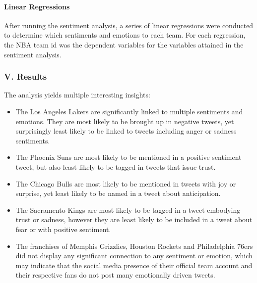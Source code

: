 \documentclass[
]{article}
\begin{document}
\hfill\break

\hypertarget{linear-regressions}{%
\paragraph{Linear Regressions}\label{linear-regressions}}

After running the sentiment analysis, a series of linear regressions
were conducted to determine which sentiments and emotions to each team.
For each regression, the NBA team id was the dependent variables for the
variables attained in the sentiment analysis.

\hfill\break

\hypertarget{v.-results}{%
\subsubsection{V. Results}\label{v.-results}}

The analysis yields multiple interesting insights:

\begin{itemize}
\item
  The Los Angeles Lakers are significantly linked to multiple sentiments
  and emotions. They are most likely to be brought up in negative
  tweets, yet surprisingly least likely to be linked to tweets including
  anger or sadness sentiments.
\item
  The Phoenix Suns are most likely to be mentioned in a positive
  sentiment tweet, but also least likely to be tagged in tweets that
  issue trust.
\item
  The Chicago Bulls are most likely to be mentioned in tweets with joy
  or surprise, yet least likely to be named in a tweet about
  anticipation.
\item
  The Sacramento Kings are most likely to be tagged in a tweet embodying
  trust or sadness, however they are least likely to be included in a
  tweet about fear or with positive sentiment.
\item
  The franchises of Memphis Grizzlies, Houston Rockets and Philadelphia
  76ers did not display any significant connection to any sentiment or
  emotion, which may indicate that the social media presence of their
  official team account and their respective fans do not post many
  emotionally driven tweets.
\end{itemize}
\end{document}
